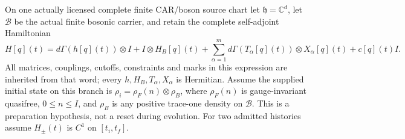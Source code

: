 \documentclass[12pt,a4paper]{article}
\begin{document}
\begin{theorem}
\label{p4:thm:v248-current-determinant-sum}
On one actually licensed complete finite CAR/boson source chart let
$\mathfrak h=\mathbb C^d$, let $\mathcal B$ be the actual finite bosonic
carrier, and retain the complete self-adjoint Hamiltonian
\[
 H[q](t)=d\Gamma(h[q](t))\otimes I+I\otimes H_B[q](t)
 +\sum_{\alpha=1}^m d\Gamma(T_\alpha[q](t))\otimes X_\alpha[q](t)
 +c[q](t)I.
\]
All matrices, couplings, cutoffs, constraints and marks in this expression
are inherited from that word; every $h,H_B,T_\alpha,X_\alpha$ is Hermitian.
Assume the supplied initial state on this branch is
$\rho_i=\rho_F(n)\otimes\rho_B$, where $\rho_F(n)$ is gauge-invariant
quasifree, $0\le n\le I$, and $\rho_B$ is any positive trace-one density
on $\mathcal B$. This is a preparation hypothesis, not a reset during
evolution. For two admitted histories assume $H_\pm(t)$ is $C^1$ on
$[t_i,t_f]$.


\end{theorem}
\end{document}
